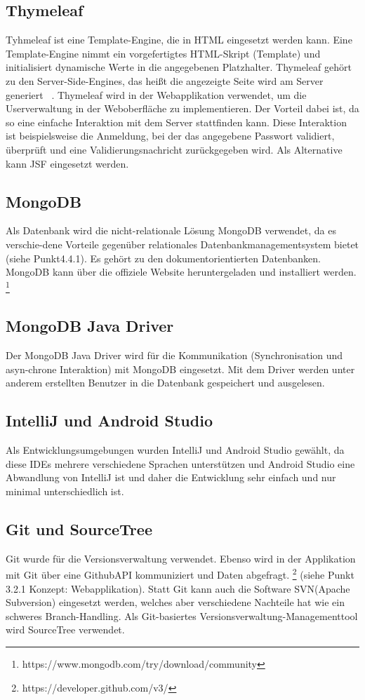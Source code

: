 \subsection{Thymeleaf}
Tyhmeleaf ist eine Template-Engine, die in HTML eingesetzt werden kann. Eine Template-Engine nimmt ein vorgefertigtes HTML-Skript (Template) und initialisiert dynamische Werte in die angegebenen Platzhalter. Thymeleaf gehört zu den Server-Side-Engines, das heißt die angezeigte Seite wird am Server generiert ~\parencite{searchmetrics}. Thymeleaf wird in der Webapplikation verwendet, um die Userverwaltung in der Weboberfläche zu implementieren. Der Vorteil dabei ist, da so eine einfache Interaktion mit dem Server stattfinden kann. Diese Interaktion ist beispielsweise die Anmeldung, bei der das angegebene Passwort validiert, überprüft und eine Validierungsnachricht zurückgegeben wird. Als Alternative kann JSF eingesetzt werden. 
\subsection{MongoDB}
Als Datenbank wird die nicht-relationale Lösung MongoDB verwendet, da es verschie-dene Vorteile gegenüber relationales Datenbankmanagementsystem bietet (siehe Punkt4.4.1). Es gehört zu den dokumentorientierten Datenbanken. MongoDB kann über die offiziele Website heruntergeladen und installiert werden. \footnote{https://www.mongodb.com/try/download/community}
\subsection{MongoDB Java Driver}
Der MongoDB Java Driver wird für die Kommunikation (Synchronisation und asyn-chrone Interaktion) mit MongoDB eingesetzt. Mit dem Driver werden unter anderem erstellten Benutzer in die Datenbank gespeichert und ausgelesen.
\subsection{IntelliJ und Android Studio}
Als Entwicklungsumgebungen wurden IntelliJ und Android Studio gewählt, da diese IDEs mehrere verschiedene Sprachen unterstützen und Android Studio eine Abwandlung von IntelliJ ist und daher die Entwicklung sehr einfach und nur minimal unterschiedlich ist.
\subsection{Git und SourceTree}
Git wurde für die Versionsverwaltung verwendet. Ebenso wird in der Applikation mit Git über eine GithubAPI kommuniziert und Daten abgefragt. \footnote{https://developer.github.com/v3/} (siehe Punkt 3.2.1 Konzept: Webapplikation). Statt Git kann auch die Software SVN(Apache Subversion) eingesetzt werden, welches aber verschiedene Nachteile hat wie ein schweres Branch-Handling. Als Git-basiertes Versionsverwaltung-Managementtool wird SourceTree verwendet.

